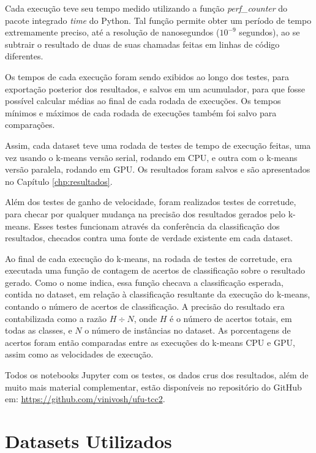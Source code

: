 \documentclass[12pt,
openright, 
oneside, %
a4paper,    %
brazil]{facom-ufu-abntex2}
\begin{document}
Cada execução teve seu tempo medido utilizando a função \textit{perf\_counter} do pacote integrado \textit{time} do Python. Tal função permite obter um período de tempo extremamente preciso, até a resolução de nanosegundos ($10^{-9}$ segundos), ao se subtrair o resultado de duas de suas chamadas feitas em linhas de código diferentes.

Os tempos de cada execução foram sendo exibidos ao longo dos testes, para exportação posterior dos resultados, e salvos em um acumulador, para que fosse possível calcular médias ao final de cada rodada de execuções. Os tempos mínimos e máximos de cada rodada de execuções também foi salvo para comparações.

Assim, cada dataset teve uma rodada de testes de tempo de execução feitas, uma vez usando o k-means versão serial, rodando em CPU, e outra com o k-means versão paralela, rodando em GPU. Os resultados foram salvos e são apresentados no Capítulo \ref{chp:resultados}.

Além dos testes de ganho de velocidade, foram realizados testes de corretude, para checar por qualquer mudança na precisão dos resultados gerados pelo k-means. Esses testes funcionam através da conferência da classificação dos resultados, checados contra uma fonte de verdade existente em cada dataset.

Ao final de cada execução do k-means, na rodada de testes de corretude, era executada uma função de contagem de acertos de classificação sobre o resultado gerado. Como o nome indica, essa função checava a classificação esperada, contida no dataset, em relação à classificação resultante da execução do k-means, contando o número de acertos de classificação. A precisão do resultado era contabilizada como a razão $H \div N$, onde $H$ é o número de acertos totais, em todas as classes, e $N$ o número de instâncias no dataset. As porcentagens de acertos foram então comparadas entre as execuções do k-means CPU e GPU, assim como as velocidades de execução.

Todos os notebooks Jupyter com os testes, os dados crus dos resultados, além de muito mais material complementar, estão disponíveis no repositório do GitHub em: \href{https://github.com/vinivosh/ufu-tcc2}{https://github.com/vinivosh/ufu-tcc2}.




\section{Datasets Utilizados}
\label{sec:datasets}
\end{document}
